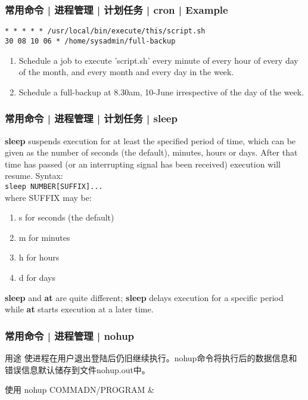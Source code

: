 \begin{frame}[fragile]
  \frametitle{常用命令 | 进程管理 | 计划任务 | cron | Example}
\begin{lstlisting}
* * * * * /usr/local/bin/execute/this/script.sh
30 08 10 06 * /home/sysadmin/full-backup
\end{lstlisting}
\pause
\begin{enumerate}
  \item Schedule a job to execute 'script.sh' every minute of every hour of every day of the month, and every month and every day in the week.
  \item Schedule a full-backup at 8.30am, 10-June irrespective of the day of the week.
\end{enumerate}
\end{frame}

\begin{frame}[fragile]
  \frametitle{常用命令 | 进程管理 | 计划任务 | sleep}
  \textbf{sleep} suspends execution for at least the specified period of time, which can be given as the number of seconds (the default), minutes, hours or days. After that time has passed (or an interrupting signal has been received) execution will resume. Syntax:\\
  \vspace{0.1cm}
  \verb|sleep NUMBER[SUFFIX]...|\\
  \vspace{0.1cm}
  where SUFFIX may be:
  \begin{enumerate}
    \item s for seconds (the default)
    \item m for minutes
    \item h for hours
    \item d for days
  \end{enumerate}
  \textbf{sleep} and \textbf{at} are quite different; \textbf{sleep} delays execution for a specific period while \textbf{at} starts execution at a later time.
\end{frame}

\begin{frame}
  \frametitle{常用命令 | 进程管理 | \alert{nohup}}
  \begin{block}{用途}
    使进程在用户退出登陆后仍旧继续执行。nohup命令将执行后的数据信息和错误信息默认储存到文件nohup.out中。
  \end{block}
  \pause
  \begin{block}{使用}
    nohup COMMADN/PROGRAM \&
  \end{block}
\end{frame}

